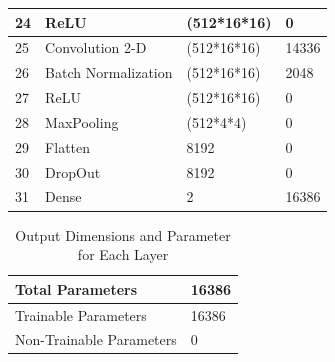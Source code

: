 \begin{table}
\begin{tabular}{|l|l|l|l|}
		24 & ReLU & (512*16*16) & 0 \\                       \hline
		25 & Convolution 2-D & (512*16*16) & 14336 \\        \hline
		26 & Batch Normalization & (512*16*16) & 2048 \\     \hline
		27 & ReLU & (512*16*16) & 0 \\                       \hline
		28 & MaxPooling & (512*4*4) & 0 \\                   \hline
		29 & Flatten & 8192 & 0 \\                           \hline
		30 & DropOut & 8192 & 0 \\                           \hline
		31 & Dense & 2 & 16386 \\\hline
		\end{tabular}
	\end{table}

	\begin{table}[ht]
		\begin{tabularx}{1.03\textwidth}{|X|X|}
			\hline
			Total Parameters & 16386 \\ \hline
			Trainable Parameters & 16386 \\  \hline
			Non-Trainable Parameters & 0 \\ \hline
			\end{tabularx}
			\caption{Output Dimensions and Parameter for Each Layer}
		\end{table}

\clearpage
